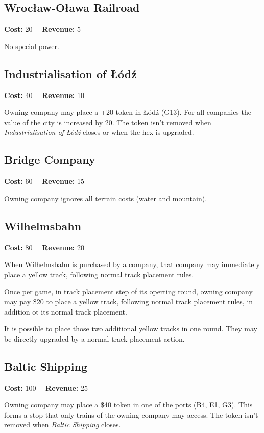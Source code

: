 \documentclass[10pt,a4paper,twocolumn]{article}
\begin{document}
\subsection{Wrocław-Oława Railroad}

\textbf{Cost:} 20 ~~\textbf{Revenue:} 5

No special power.

\subsection{Industrialisation of Łódź}

\textbf{Cost:} 40 ~~\textbf{Revenue:} 10

Owning company may place a +20 token in Łódź (G13). For all companies the value of the city is increased by 20. The token isn't removed when \textit{Industrialisation of Łódź} closes or when the hex is upgraded. 

\subsection{Bridge Company}

\textbf{Cost:} 60 ~~\textbf{Revenue:} 15

Owning company ignores all terrain costs (water and mountain).

\subsection{Wilhelmsbahn}

\textbf{Cost:} 80 ~~\textbf{Revenue:} 20

When Wilhelmsbahn is purchased by a company, that company may immediately place a yellow track, following normal track placement rules.

Once per game, in track placement step of its operting round, owning company may pay \$20 to place a yellow track, following normal track placement rules, in addition ot its normal track placement. 

It is possible to place those two additional yellow tracks in one round. They may be directly upgraded by a normal track placement action.

\subsection{Baltic Shipping}

\textbf{Cost:} 100 ~~\textbf{Revenue:} 25

Owning company may place a \$40 token in one of the ports (B4, E1, G3). This forms a stop that only trains of the owning company may access. The token isn't removed when \textit{Baltic Shipping} closes.
\end{document}
